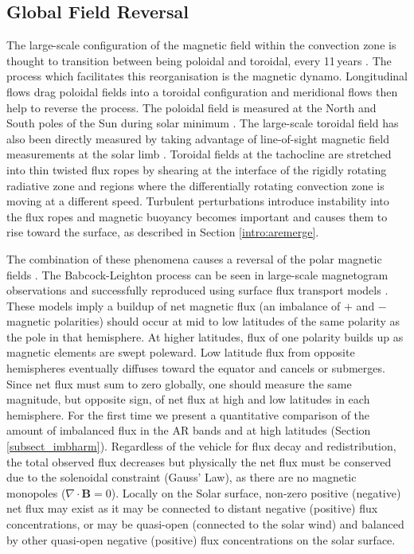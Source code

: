 \subsection{Global Field Reversal}\label{intro:fieldreversal}

The large-scale configuration of the magnetic field within the convection zone is thought to transition between being poloidal and toroidal, every 11\,years \citep{Parker:1955}. The process which facilitates this reorganisation is the magnetic dynamo. Longitudinal flows drag poloidal fields into a toroidal configuration and meridional flows then help to reverse the process. The poloidal field is measured at the North and South poles of the Sun during solar minimum \citep{Harvey:2002}. The large-scale toroidal field has also been directly measured by taking advantage of line-of-sight magnetic field measurements at the solar limb \citep{Ulrich:2005}. Toroidal fields at the tachocline are stretched into thin twisted flux ropes by shearing at the interface of the rigidly rotating radiative zone and regions where the differentially rotating convection zone is moving at a different speed. Turbulent perturbations introduce instability into the flux ropes and magnetic buoyancy becomes important and causes them to rise toward the surface, as described in Section \ref{intro:aremerge}.

The combination of these phenomena causes a reversal of the polar magnetic fields \citep{Babcock:1961,Leighton:1964}. The Babcock-Leighton process can be seen in large-scale magnetogram observations \citep{Harvey:1992} and successfully reproduced using surface flux transport models \citep{Wang:1989,Schrijver:2003}. These models imply a buildup of net magnetic flux (an imbalance of $+$ and $-$ magnetic polarities) should occur at mid to low latitudes of the same polarity as the pole in that hemisphere. At higher latitudes, flux of one polarity builds up as magnetic elements are swept poleward. Low latitude flux from opposite hemispheres eventually diffuses toward the equator and cancels or submerges. Since net flux must sum to zero globally, one should measure the same magnitude, but opposite sign, of net flux at high and low latitudes in each hemisphere. For the first time we present a quantitative comparison of the amount of imbalanced flux in the AR bands and at high latitudes (Section \ref{subsect_imbharm}).
Regardless of the vehicle for flux decay and redistribution, the total observed flux decreases but physically the net flux must be conserved due to the solenoidal constraint (Gauss' Law), as there are no magnetic monopoles ($\nabla\cdot\mathbf{B}=0$).
Locally on the Solar surface, non-zero positive (negative) net flux may exist as it may be connected to distant negative (positive) flux concentrations, or may be quasi-open (connected to the solar wind) and balanced by other quasi-open negative (positive) flux concentrations on the solar surface.

